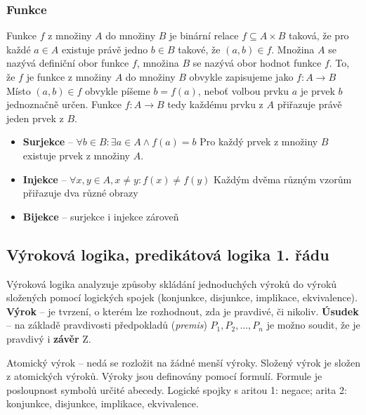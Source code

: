 \subsubsection{Funkce}
Funkce $f$ z množiny $A$ do množiny $B$ je binární relace $f \subseteq A \times B$ taková, že pro každé $a \in A$ existuje právě jedno $b \in B$ takové, že  $(a, b) \in f$. Množina $A$ se nazývá definiční obor funkce $f$, množina $B$ se nazývá obor hodnot funkce $f$.
To, že $f$ je funkce z množiny $A$ do množiny $B$ obvykle zapisujeme jako $f : A \rightarrow B$ Místo $(a,b) \in f$ obvykle píšeme $b=f(a)$, neboť volbou prvku $a$ je prvek $b$ jednoznačně určen. Funkce $f : A \rightarrow B$ tedy každému prvku z $A$ přiřazuje právě jeden prvek z $B$.

\begin{itemize}
\item \textbf{Surjekce} --  $\forall b \in B : \exists a \in A \wedge f(a) = b$ Pro každý prvek z množiny $B$ existuje prvek z množiny $A$.
\item \textbf{Injekce} --  $\forall x,y \in A, x \neq y : f(x) \neq f(y)$ Každým dvěma různým vzorům přiřazuje dva různé obrazy
\item \textbf{Bijekce} -- surjekce i injekce zároveň
\end{itemize}

\subsection{Výroková logika, predikátová logika 1. řádu}
Výroková logika analyzuje způsoby skládání jednoduchých výroků do výroků složených pomocí logických spojek (konjunkce, disjunkce, implikace, ekvivalence). \textbf{Výrok} -- je tvrzení, o kterém lze rozhodnout, zda je pravdivé, či nikoliv. \textbf{Úsudek} --  na základě pravdivosti předpokladů (\textit{premis}) $P_1, P_2, \ldots, P_n$ je možno soudit, že je pravdivý i \textbf{závěr} Z.

Atomický výrok -- nedá se rozložit na žádné menší výroky. Složený výrok je složen z atomických výroků. Výroky jsou definovány pomocí formulí. 
Formule je posloupnost symbolů určité abecedy. Logické spojky s aritou 1: negace; arita 2: konjunkce, disjunkce, implikace, ekvivalence.



